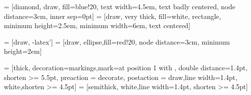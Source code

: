 
\usepackage[english]{babel} 
\usepackage{amsthm} 

\usepackage{algorithm}
\usepackage{algorithmic}
\usepackage{amssymb}
\usepackage{graphicx}
\usepackage{wrapfig}
\usepackage{blkarray, bigstrut}
\usepackage{bm}
\usepackage{ stmaryrd } 

\usepackage{romannum}

\usepackage[normalem]{ulem}
\usepackage{mathpartir}
\usepackage{color}
\usepackage{subcaption} %
\usepackage{mathtools}
\DeclarePairedDelimiter{\ceil}{\lceil}{\rceil}
\DeclarePairedDelimiter{\floor}{\lfloor}{\rfloor}
\usepackage{fourier} 
\usepackage{tikz}
\usetikzlibrary{shapes,arrows,snakes,decorations.markings}
\usetikzlibrary{svg.path,arrows.meta, calc} 

 = [diamond, draw, fill=blue!20, 
    text width=4.5em, text badly centered, node distance=3cm, inner sep=0pt]
 = [draw, very thick, fill=white, rectangle, 
    minimum height=2.5em, minimum width=6em, text centered]

 = [draw, -latex']
 = [draw, ellipse,fill=red!20, node distance=3cm,    minimum height=2em]

 = [thick, decoration={markings,mark=at position
   1 with {}},
   double distance=1.4pt, shorten >= 5.5pt,
   preaction = {decorate},
   postaction = {draw,line width=1.4pt, white,shorten >= 4.5pt}]
 = [semithick, white,line width=1.4pt, shorten >= 4.5pt]

\usepackage{multirow}


\usepackage{listings}
\usepackage{xcolor}
\usepackage{courier}


\lstset{style=mystyle}


